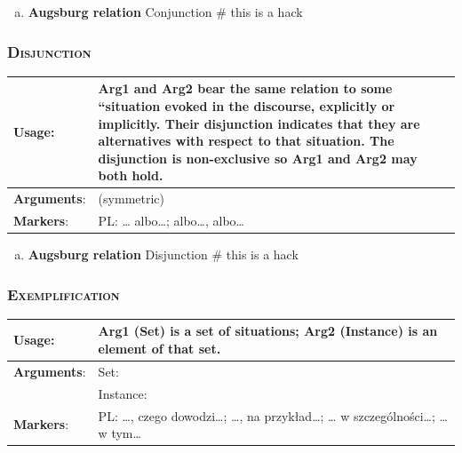 \documentclass{udisc}
\begin{document}
\begin{enumerate}[a)]
\item \textbf{Augsburg relation} Conjunction
\nonstopmode # this is a hack
\end{enumerate}
\errorstopmode




\subsubsection{\textsc{Disjunction}}

\begin{tabularx}{\textwidth}{|l|L|}
\hline

\textbf{Usage}:           &  Arg1 and Arg2 bear the same relation to some “situation evoked in the discourse, explicitly or implicitly. Their disjunction indicates that they are alternatives with respect to that situation. The disjunction is non-exclusive so Arg1 and Arg2 may both hold. \\
\hline

\textbf{Arguments}:       &  (symmetric) \\
\hline

\textbf{Markers}:        &  PL: … albo…; albo…, albo… \\
\hline

\end{tabularx}

\begin{enumerate}[a)]
\item \textbf{Augsburg relation} Disjunction
\nonstopmode # this is a hack
\end{enumerate}
\errorstopmode



\subsubsection{\textsc{Exemplification}}

\begin{tabularx}{\textwidth}{|l|L|}
\hline

\textbf{Usage}:           &  Arg1 (Set) is a set of situations; Arg2 (Instance) is an element of that set. \\
\hline

\textbf{Arguments}:       &  Set:  \\
                          &  Instance:  \\
\hline

\textbf{Markers}:        &  PL: …, czego dowodzi…; …, na przykład…; … w szczególności…; … w tym…  \\
\hline

\end{tabularx}
\end{document}
